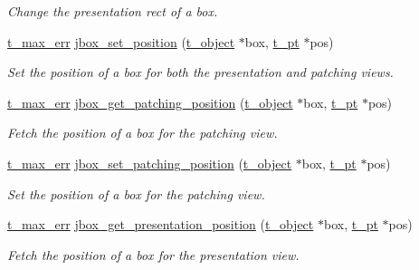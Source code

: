 \begin{DoxyCompactItemize}
\begin{DoxyCompactList}\small\item\em Change the presentation rect of a box. \item\end{DoxyCompactList}\item 
\hyperlink{group__datatypes_ga73edaae82b318855cc09fac994918165}{t\_\-max\_\-err} \hyperlink{group__jbox_gae1901dd9922577bb4bcc33665dd4e7f6}{jbox\_\-set\_\-position} (\hyperlink{structt__object}{t\_\-object} $\ast$box, \hyperlink{structt__pt}{t\_\-pt} $\ast$pos)
\begin{DoxyCompactList}\small\item\em Set the position of a box for both the presentation and patching views. \item\end{DoxyCompactList}\item 
\hyperlink{group__datatypes_ga73edaae82b318855cc09fac994918165}{t\_\-max\_\-err} \hyperlink{group__jbox_gaf2b95be91e66caa72238838b2068356f}{jbox\_\-get\_\-patching\_\-position} (\hyperlink{structt__object}{t\_\-object} $\ast$box, \hyperlink{structt__pt}{t\_\-pt} $\ast$pos)
\begin{DoxyCompactList}\small\item\em Fetch the position of a box for the patching view. \item\end{DoxyCompactList}\item 
\hyperlink{group__datatypes_ga73edaae82b318855cc09fac994918165}{t\_\-max\_\-err} \hyperlink{group__jbox_gac4baff3db6cac220f46e73a3f6986ac9}{jbox\_\-set\_\-patching\_\-position} (\hyperlink{structt__object}{t\_\-object} $\ast$box, \hyperlink{structt__pt}{t\_\-pt} $\ast$pos)
\begin{DoxyCompactList}\small\item\em Set the position of a box for the patching view. \item\end{DoxyCompactList}\item 
\hyperlink{group__datatypes_ga73edaae82b318855cc09fac994918165}{t\_\-max\_\-err} \hyperlink{group__jbox_gae4db002ae3ff252be9e0fe1fce5aaffb}{jbox\_\-get\_\-presentation\_\-position} (\hyperlink{structt__object}{t\_\-object} $\ast$box, \hyperlink{structt__pt}{t\_\-pt} $\ast$pos)
\begin{DoxyCompactList}\small\item\em Fetch the position of a box for the presentation view. \item\end{DoxyCompactList}\item 

\end{DoxyCompactItemize}
